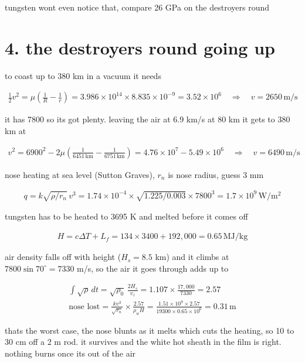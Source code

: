 \documentclass[11pt]{article}
\newcommand{\un}[1]{\,\mathrm{#1}}
\begin{document}
tungsten wont even notice that, compare 26 GPa on the destroyers round

\section*{4. the destroyers round going up}

to coast up to 380 km in a vacuum it needs

\begin{align*}
\tfrac12 v^2 = \mu\left(\tfrac1R - \tfrac1r\right) = 3.986\times10^{14} \times 8.835\times10^{-9} = 3.52\times10^6
\quad\Rightarrow\quad v = 2650\un{m/s}
\end{align*}

it has 7800 so its got plenty. leaving the air at 6.9 km/s at 80 km it gets to 380 km at

\begin{align*}
v^2 = 6900^2 - 2\mu\left(\tfrac{1}{6451\un{km}} - \tfrac{1}{6751\un{km}}\right) = 4.76\times10^7 - 5.49\times10^6 \quad\Rightarrow\quad v = 6490\un{m/s}
\end{align*}

nose heating at sea level (Sutton Graves), $r_n$ is nose radius, guess 3 mm

\begin{align*}
q = k\sqrt{\rho/r_n}\,v^3 = 1.74\times10^{-4} \times \sqrt{1.225/0.003} \times 7800^3 = 1.7\times10^{9}\un{W/m^2}
\end{align*}

tungsten has to be heated to 3695 K and melted before it comes off

\begin{align*}
H = c\Delta T + L_f = 134 \times 3400 + 192{,}000 = 0.65\un{MJ/kg}
\end{align*}

air density falls off with height ($H_s = 8.5$ km) and it climbs at $7800\sin70^\circ = 7330$ m/s, so the air it goes through adds up to

\begin{align*}
\int\!\sqrt{\rho}\,dt = \sqrt{\rho_0}\,\frac{2H_s}{v_z} = 1.107 \times \frac{17{,}000}{7330} = 2.57\\
\text{nose lost} = \frac{k v^3}{\sqrt{r_n}} \times \frac{2.57}{\rho_w H} = \frac{1.51\times10^9 \times 2.57}{19300 \times 0.65\times10^6} = 0.31\un{m}
\end{align*}

thats the worst case, the nose blunts as it melts which cuts the heating, so 10 to 30 cm off a 2 m rod. it survives and the white hot sheath in the film is right. nothing burns once its out of the air
\end{document}
